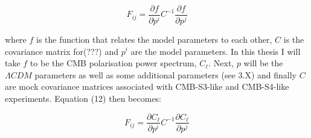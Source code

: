 \begin{equation}
F_{ij} = \frac{\partial f}{\partial p^i} C^{-1} \frac{\partial f}{\partial p^j}
\end{equation}

where $f$ is the function that relates the model parameters to each other, $C$ is the covariance matrix for(???) and $p^{i}$ are the model parameters. In this thesis I will take $f$ to be the CMB polarisation power spectrum, $C_{\ell}$. Next, ${p}$ will be the $\Lambda CDM$ parameters as well as some additional parameters (see 3.X) and finally $C$ are mock covariance matrices associated with CMB-S3-like and CMB-S4-like experiments. Equation (12) then becomes:

\begin{equation}
F_{ij} = \frac{\partial C_{\ell}}{\partial p^i} C^{-1} \frac{\partial C_{\ell}}{\partial p^j}
\end{equation}


